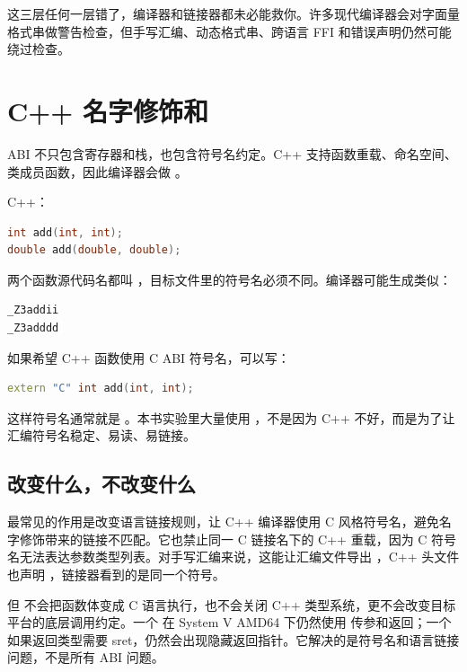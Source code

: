 这三层任何一层错了，编译器和链接器都未必能救你。许多现代编译器会对字面量格式串做警告检查，但手写汇编、动态格式串、跨语言 FFI 和错误声明仍然可能绕过检查。

\section{C++ 名字修饰和 }

ABI 不只包含寄存器和栈，也包含符号名约定。C++ 支持函数重载、命名空间、类成员函数，因此编译器会做 。

C++：

\begin{lstlisting}[language=C++]
int add(int, int);
double add(double, double);
\end{lstlisting}

两个函数源代码名都叫 ，目标文件里的符号名必须不同。编译器可能生成类似：

\begin{lstlisting}
_Z3addii
_Z3adddd
\end{lstlisting}

如果希望 C++ 函数使用 C ABI 符号名，可以写：

\begin{lstlisting}[language=C++]
extern "C" int add(int, int);
\end{lstlisting}

这样符号名通常就是 。本书实验里大量使用 ，不是因为 C++ 不好，而是为了让汇编符号名稳定、易读、易链接。

\subsection{ 改变什么，不改变什么}

 最常见的作用是改变语言链接规则，让 C++ 编译器使用 C 风格符号名，避免名字修饰带来的链接不匹配。它也禁止同一 C 链接名下的 C++ 重载，因为 C 符号名无法表达参数类型列表。对手写汇编来说，这能让汇编文件导出 ，C++ 头文件也声明 ，链接器看到的是同一个符号。

但  不会把函数体变成 C 语言执行，也不会关闭 C++ 类型系统，更不会改变目标平台的底层调用约定。一个  在 System V AMD64 下仍然使用  传参和返回；一个  如果返回类型需要 sret，仍然会出现隐藏返回指针。它解决的是符号名和语言链接问题，不是所有 ABI 问题。

